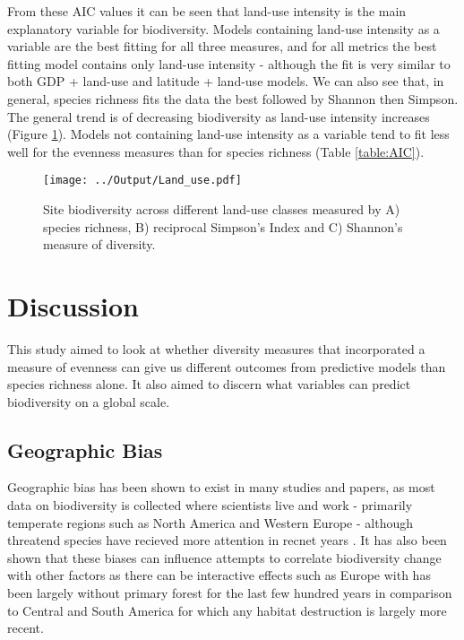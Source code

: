 \documentclass[11pt]{article}
\begin{document}
From these AIC values it can be seen that land-use intensity is the main explanatory variable for biodiversity. Models containing land-use intensity as a variable are the best fitting for all three measures, and for all metrics the best fitting model contains only land-use intensity - although the fit is very similar to both GDP + land-use and latitude + land-use models. We can also see that, in general, species richness fits the data the best followed by Shannon then Simpson. The general trend is of decreasing biodiversity as land-use intensity increases (Figure \ref{fig:land_use}). Models not containing land-use intensity as a variable tend to fit less well for the evenness measures than for species richness (Table \ref{table:AIC}).
\vfill
\begin{figure}[h]
    \centering
    \texttt{[image: ../Output/Land\_use.pdf]}  
    \caption{Site biodiversity across different land-use classes measured by A) species richness, B) reciprocal Simpson's Index and C) Shannon's measure of diversity.}
    \label{fig:land_use}
\end{figure}
\vspace*{0.07\textheight}
\newpage

\section{Discussion}

This study aimed to look at whether diversity measures that incorporated a measure of evenness can give us different outcomes from predictive models than species richness alone. It also aimed to discern what variables can predict biodiversity on a global scale.

\subsection{Geographic Bias}

Geographic bias has been shown to exist in many studies and papers, as most data on biodiversity is collected where scientists live and work - primarily temperate regions such as North America and Western Europe \parencite{Trimble2012} - although threatend species have recieved more attention in recnet years \parencite{Roberts2016}. It has also been shown that these biases can influence attempts to correlate biodiversity change with other factors as there can be interactive effects \parencite{DePalma2016} such as Europe with has been largely without primary forest for the last few hundred years in comparison to Central and South America for which any habitat destruction is largely more recent. 
\end{document}
